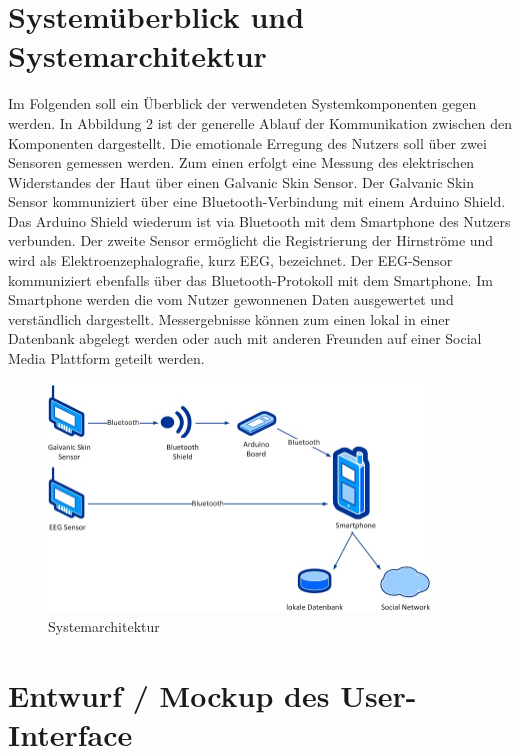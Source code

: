 \documentclass[10pt, a4paper, oneside, titlepage]{scrartcl} %
\begin{document}
   \newpage
   \section{Systemüberblick und Systemarchitektur}
   Im Folgenden soll ein Überblick der verwendeten Systemkomponenten gegen werden. In Abbildung 2 ist der generelle Ablauf der Kommunikation zwischen den Komponenten dargestellt. Die emotionale Erregung des Nutzers soll über zwei Sensoren gemessen werden. Zum einen erfolgt eine Messung des elektrischen Widerstandes der Haut über einen Galvanic Skin Sensor. Der Galvanic Skin Sensor kommuniziert über eine Bluetooth-Verbindung mit einem Arduino Shield. Das Arduino Shield wiederum ist via Bluetooth mit dem Smartphone des Nutzers verbunden. Der zweite Sensor ermöglicht die Registrierung der Hirnströme und wird als  Elektroenzephalografie, kurz EEG, bezeichnet. Der EEG-Sensor kommuniziert ebenfalls über das Bluetooth-Protokoll mit dem Smartphone. Im Smartphone werden die vom Nutzer gewonnenen Daten ausgewertet und verständlich dargestellt. Messergebnisse können zum einen lokal in einer Datenbank abgelegt werden oder auch mit anderen Freunden auf einer Social Media Plattform geteilt werden.
   	\begin{figure}[ht!]
		\begin{center}
			\includegraphics[width=0.9\textwidth]{systemarchitektur_01.jpg}
		\end{center}
		\caption[Systemarchitektur]{Systemarchitektur}
		\label{fig:system1}
	\end{figure}	
	
	\newpage
   	\section{Entwurf / Mockup des User-Interface}
\end{document}
